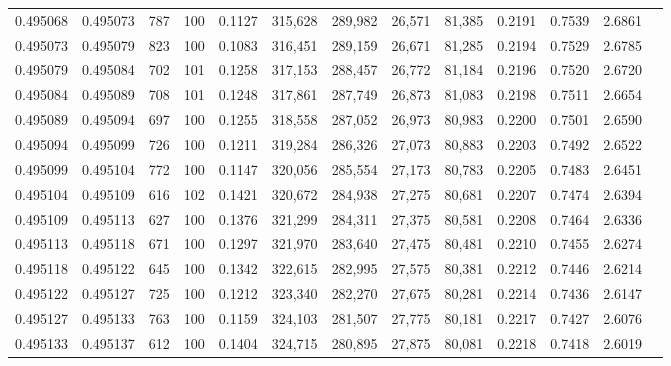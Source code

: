 \begin{tabular}{rrrrrrrrrrrrr}
0.495068 & 0.495073 &   787 & 100 &                                     0.1127 & 315,628 & 289,982 &  26,571 &  81,385 & 0.2191 & 0.7539 & 2.6861 \\
0.495073 & 0.495079 &   823 & 100 &                                     0.1083 & 316,451 & 289,159 &  26,671 &  81,285 & 0.2194 & 0.7529 & 2.6785 \\
0.495079 & 0.495084 &   702 & 101 &                                     0.1258 & 317,153 & 288,457 &  26,772 &  81,184 & 0.2196 & 0.7520 & 2.6720 \\
0.495084 & 0.495089 &   708 & 101 &                                     0.1248 & 317,861 & 287,749 &  26,873 &  81,083 & 0.2198 & 0.7511 & 2.6654 \\
0.495089 & 0.495094 &   697 & 100 &                                     0.1255 & 318,558 & 287,052 &  26,973 &  80,983 & 0.2200 & 0.7501 & 2.6590 \\
0.495094 & 0.495099 &   726 & 100 &                                     0.1211 & 319,284 & 286,326 &  27,073 &  80,883 & 0.2203 & 0.7492 & 2.6522 \\
0.495099 & 0.495104 &   772 & 100 &                                     0.1147 & 320,056 & 285,554 &  27,173 &  80,783 & 0.2205 & 0.7483 & 2.6451 \\
0.495104 & 0.495109 &   616 & 102 &                                     0.1421 & 320,672 & 284,938 &  27,275 &  80,681 & 0.2207 & 0.7474 & 2.6394 \\
0.495109 & 0.495113 &   627 & 100 &                                     0.1376 & 321,299 & 284,311 &  27,375 &  80,581 & 0.2208 & 0.7464 & 2.6336 \\
0.495113 & 0.495118 &   671 & 100 &                                     0.1297 & 321,970 & 283,640 &  27,475 &  80,481 & 0.2210 & 0.7455 & 2.6274 \\
0.495118 & 0.495122 &   645 & 100 &                                     0.1342 & 322,615 & 282,995 &  27,575 &  80,381 & 0.2212 & 0.7446 & 2.6214 \\
0.495122 & 0.495127 &   725 & 100 &                                     0.1212 & 323,340 & 282,270 &  27,675 &  80,281 & 0.2214 & 0.7436 & 2.6147 \\
0.495127 & 0.495133 &   763 & 100 &                                     0.1159 & 324,103 & 281,507 &  27,775 &  80,181 & 0.2217 & 0.7427 & 2.6076 \\
0.495133 & 0.495137 &   612 & 100 &                                     0.1404 & 324,715 & 280,895 &  27,875 &  80,081 & 0.2218 & 0.7418 & 2.6019 \\

\end{tabular}
